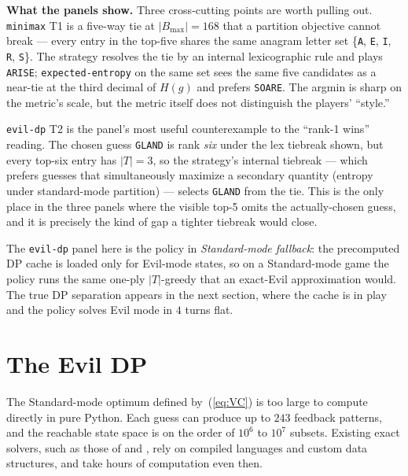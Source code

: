 \documentclass[11pt]{article}
\begin{document}
\medskip
\noindent\textbf{What the panels show.} Three cross-cutting points
are worth pulling out. \texttt{minimax} T1 is a five-way tie at
$|B_{\max}| = 168$ that a partition objective cannot break ---
every entry in the top-five shares the same anagram letter set
\{\texttt{A}, \texttt{E}, \texttt{I}, \texttt{R}, \texttt{S}\}. The
strategy resolves the tie by an internal lexicographic rule and
plays \texttt{ARISE}; \texttt{expected-entropy} on the same set
sees the same five candidates as a near-tie at the third decimal of
$H(g)$ and prefers \texttt{SOARE}. The argmin is sharp on the
metric's scale, but the metric itself does not distinguish the
players' ``style.''\par
\noindent\texttt{evil-dp} T2 is the panel's most useful counterexample
to the ``rank-1 wins'' reading. The chosen guess \texttt{GLAND} is
rank \emph{six} under the lex tiebreak shown, but every top-six
entry has $|T| = 3$, so the strategy's internal tiebreak --- which
prefers guesses that simultaneously maximize a secondary quantity
(entropy under standard-mode partition) --- selects \texttt{GLAND}
from the tie. This is the only place in the three panels where the
visible top-5 omits the actually-chosen guess, and it is precisely
the kind of gap a tighter tiebreak would close.\par
\noindent The \texttt{evil-dp} panel here is the policy in
\emph{Standard-mode fallback}: the precomputed DP cache is loaded
only for Evil-mode states, so on a Standard-mode game the policy
runs the same one-ply $|T|$-greedy that an exact-Evil approximation
would. The true DP separation appears in the next section, where
the cache is in play and the policy solves Evil mode in $4$ turns
flat.

\section*{The Evil DP}

The Standard-mode optimum defined by~(\ref{eq:VC}) is too large to
compute directly in pure Python. Each guess can produce up to $243$
feedback patterns, and the reachable state space is on the order of
$10^6$ to $10^7$ subsets. Existing exact solvers, such as those of
\citet{bertsimas2022wordle} and \citet{selby2022wordle}, rely on
compiled languages and custom data structures, and take hours of
computation even then.
\end{document}
